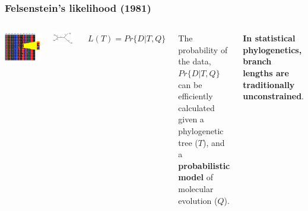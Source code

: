 \begin{frame}[plain]
\frametitle{Felsenstein's likelihood (1981)}

\begin{columns}[t]


\includegraphics[width=\textwidth]{../images/MolecularEvolModel1}


\includegraphics[width=0.9\textwidth]{../images/MolecularEvolModel2}

\smallskip{}

$L(T) = Pr\{D|T,Q\}$

\medskip{}

\scriptsize{
The probability of the data, \textbf{$Pr\{D|T,Q\}$} can be efficiently calculated given a phylogenetic tree ($T$), and a \textbf{probabilistic model} of molecular evolution ($Q$). 

\medskip{}

\textbf{In statistical phylogenetics, branch lengths are traditionally unconstrained}.
}

\end{columns}

\end{frame}
